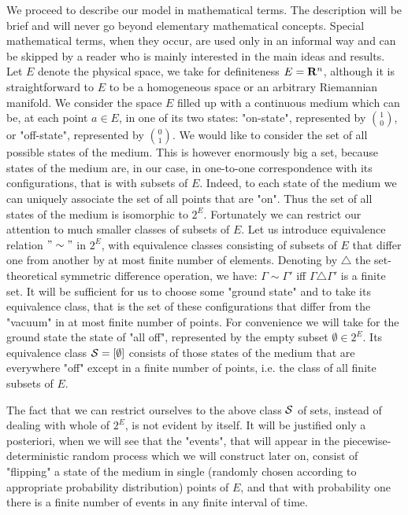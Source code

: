 \documentclass[12pt]{article}
\begin{document}
We proceed to describe our model in mathematical terms. The description
will be brief and will never go beyond elementary mathematical concepts.
Special mathematical terms, when they occur, are used only in an informal
way and can be skipped by a reader who is mainly interested in the main
ideas and results. Let $E$ denote the physical space, we take for
definiteness $E={\bf R}^n$, although it is straightforward to $E$ to be a
homogeneous space or an arbitrary Riemannian manifold. We consider the
space $E$ filled up with a continuous medium which can be, at each point
$a\in E$, in one of its two states: "on-state", represented by
${1\choose0}$, or "off-state", represented by ${0\choose1}$. We would like
to consider the set of all possible states of the medium. This is however
enormously big a set, because states of the medium are, in our case, in
one-to-one correspondence with its configurations, that is with subsets
of $E$. Indeed, to each state of the medium we can uniquely associate the
set of all points that are "on". Thus the set of all states of the medium
is isomorphic to $2^E$. Fortunately we can restrict our attention to much
smaller classes of subsets of $E$. Let us introduce equivalence relation
$"\sim "$ in $2^E$, with equivalence classes consisting of subsets of $E$
that differ one from another by at most finite number of elements. Denoting
by ${\scriptstyle\triangle}$ the set-theoretical symmetric difference
operation, we have: $\Gamma\sim \Gamma '$ iff
$\Gamma{\scriptstyle\triangle} \Gamma '$ is a finite set. It will be
sufficient for us to choose some "ground state" and to take its equivalence
class, that is the set of these configurations that differ from the
"vacuum" in at most finite number of points. For convenience we will take
for the ground state the state of "all off", represented by the empty
subset $\emptyset \in 2^E$. Its equivalence class ${\cal S} = [ \emptyset
]$ consists of those states of the medium that are everywhere "off" except
in a finite number of points, i.e. the class of all {\sl } finite subsets
of $E$.

\medskip
{}
The fact that we can restrict ourselves to the above class ${\cal S}$ of
sets, instead of dealing with whole of $2^E$, is not evident by itself. It
will be justified only a posteriori, when we will see that the "events",
that will appear in the piecewise-deterministic random process which we
will construct later on, consist of "flipping" a state of the medium in
single (randomly chosen according to appropriate probability distribution)
points of $E$, and that with probability one there is a finite number of
events in any finite interval of time.
\end{document}
